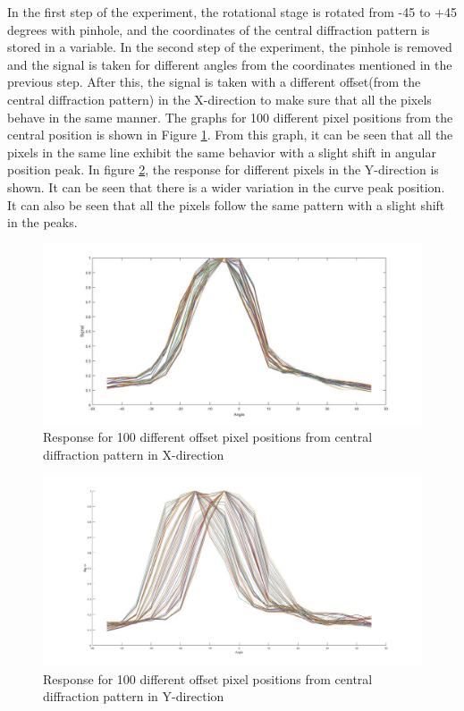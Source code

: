 In the first step of the experiment, the rotational stage is rotated from -45 to +45 degrees with pinhole, and the coordinates of the central diffraction pattern is stored in a variable. In the second step of the experiment, the pinhole is removed and the signal is taken for different angles from the coordinates mentioned in the previous step. After this, the signal is taken with a different offset(from the central diffraction pattern) in the X-direction to make sure that all the pixels behave in the same manner. The graphs for 100 different pixel positions from the central position is shown in Figure \ref{fig:offset_calib}. From this graph, it can be seen that all the pixels in the same line exhibit the same behavior with a slight shift in angular position peak. In figure \ref{fig:offset_calibY}, the response for different pixels in the Y-direction is shown. It can be seen that there is a wider variation in the curve peak position. It can also be seen that all the pixels follow the same pattern with a slight shift in the peaks.
\begin{figure}[!h]
\centering
\includegraphics[scale=0.2125]{pics/ResponseOffset.jpg}
\caption{Response for 100 different offset pixel positions from central diffraction pattern in X-direction}
\label{fig:offset_calib}
\end{figure}

\begin{figure}[!h]
\centering
\includegraphics[scale=0.150]{pics/ResponseYOffset.jpg}
\caption{Response for 100 different offset pixel positions from central diffraction pattern in Y-direction}
\label{fig:offset_calibY}
\end{figure}


